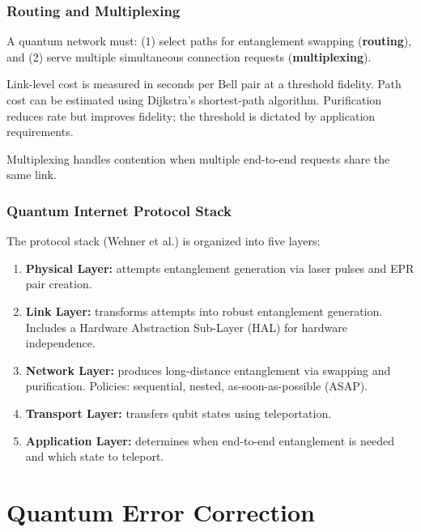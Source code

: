 \documentclass[10pt,a4paper]{article}
\begin{document}
\subsubsection*{Routing and Multiplexing}

A quantum network must: (1) select paths for entanglement swapping (\textbf{routing}), and (2) serve multiple simultaneous connection requests (\textbf{multiplexing}).

Link-level cost is measured in seconds per Bell pair at a threshold fidelity. Path cost can be estimated using Dijkstra's shortest-path algorithm. Purification reduces rate but improves fidelity; the threshold is dictated by application requirements.

Multiplexing handles contention when multiple end-to-end requests share the same link.

\subsubsection*{Quantum Internet Protocol Stack}

The protocol stack (Wehner et al.) is organized into five layers:
\begin{enumerate}[nosep]
\item \textbf{Physical Layer:} attempts entanglement generation via laser pulses and EPR pair creation.
\item \textbf{Link Layer:} transforms attempts into robust entanglement generation. Includes a Hardware Abstraction Sub-Layer (HAL) for hardware independence.
\item \textbf{Network Layer:} produces long-distance entanglement via swapping and purification. Policies: sequential, nested, as-soon-as-possible (ASAP).
\item \textbf{Transport Layer:} transfers qubit states using teleportation.
\item \textbf{Application Layer:} determines when end-to-end entanglement is needed and which state to teleport.
\end{enumerate}

\newpage

\section{Quantum Error Correction}
\end{document}
